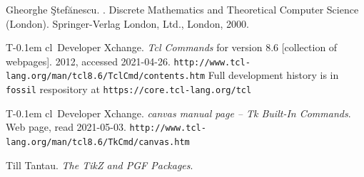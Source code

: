 \documentclass{article}
\theoremstyle{definition}
\newcommand{\Tcl}{T\kern-0.1em cl}
\providecommand{\url}[1]{\texttt{#1}}
\begin{document}
\begin{thebibliography}{99}
Gheorghe {\c{S}}tef{\u{a}}nescu.
.
\newblock Discrete Mathematics and Theoretical Computer Science (London).
  Springer-Verlag London, Ltd., London, 2000.

  \Tcl\ Developer Xchange.
  \textit{Tcl Commands} for version 8.6 [collection of webpages]. 
  2012, accessed 2021-04-26.
  \url{http://www.tcl-lang.org/man/tcl8.6/TclCmd/contents.htm}
  Full development history is in \texttt{fossil} respository at 
  \url{https://core.tcl-lang.org/tcl}

  \Tcl\ Developer Xchange.
  \textit{canvas manual page -- Tk Built-In Commands}.
  Web page, read 2021-05-03. 
  \url{http://www.tcl-lang.org/man/tcl8.6/TkCmd/canvas.htm}

  Till Tantau.
  \textit{The TikZ and PGF Packages}.

  
\end{thebibliography}
\end{document}
